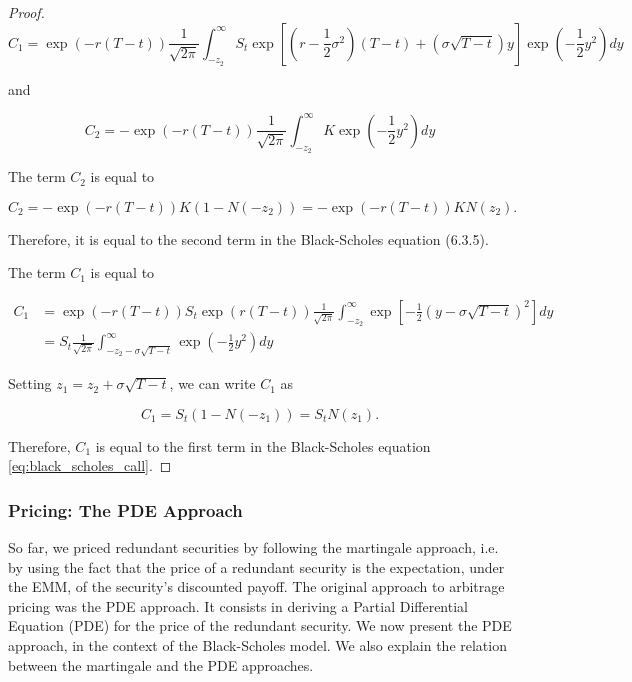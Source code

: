 \documentclass[\topdir/lecture\_notes.tex]{subfiles}
\begin{document}
\begin{proof}
\begin{equation}
C_{1}=\exp (-r(T-t)) \frac{1}{\sqrt{2 \pi}} \int_{-z_{2}}^{\infty} S_{t} \exp \left[\left(r-\frac{1}{2} \sigma^{2}\right)(T-t)+(\sigma \sqrt{T-t}) y\right] \exp \left(-\frac{1}{2} y^{2}\right) d y
\end{equation}

and

\begin{equation}
C_{2}=-\exp (-r(T-t)) \frac{1}{\sqrt{2 \pi}} \int_{-z_{2}}^{\infty} K \exp \left(-\frac{1}{2} y^{2}\right) d y
\end{equation}

The term \(C_{2}\) is equal to

\begin{equation}
C_{2}=-\exp (-r(T-t)) K\left(1-N\left(-z_{2}\right)\right)=-\exp (-r(T-t)) K N\left(z_{2}\right) .
\end{equation}

Therefore, it is equal to the second term in the Black-Scholes equation (6.3.5).

The term \(C_{1}\) is equal to

\begin{equation}
\begin{aligned}
C_{1} & =\exp (-r(T-t)) S_{t} \exp (r(T-t)) \frac{1}{\sqrt{2 \pi}} \int_{-z_{2}}^{\infty} \exp \left[-\frac{1}{2}(y-\sigma \sqrt{T-t})^{2}\right] d y \\
& =S_{t} \frac{1}{\sqrt{2 \pi}} \int_{-z_{2}-\sigma \sqrt{T-t}}^{\infty} \exp \left(-\frac{1}{2} y^{2}\right) d y
\end{aligned}
\end{equation}

Setting \(z_{1}=z_{2}+\sigma \sqrt{T-t}\), we can write \(C_{1}\) as

\begin{equation}
C_{1}=S_{t}\left(1-N\left(-z_{1}\right)\right)=S_{t} N\left(z_{1}\right) .
\end{equation}

Therefore, \(C_{1}\) is equal to the first term in the Black-Scholes equation \eqref{eq:black_scholes_call}.
\end{proof}

\subsubsection{Pricing: The PDE Approach}
So far, we priced redundant securities by following the martingale approach, i.e. by using the fact that the price of a redundant security is the expectation, under the EMM, of the security's discounted payoff. The original approach to arbitrage pricing was the PDE approach. It consists in deriving a Partial Differential Equation (PDE) for the price of the redundant security. We now present the PDE approach, in the context of the Black-Scholes model. We also explain the relation between the martingale and the PDE approaches.
\end{document}
